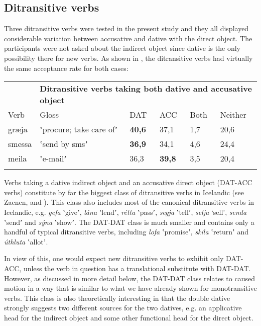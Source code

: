 \documentclass[output=paper,modfonts,nonflat]{langsci/langscibook}
\begin{document}
\subsection{Ditransitive verbs} %

Three ditransitive verbs were tested in the present study and they all displayed considerable variation between accusative and dative with the direct object. The participants were not asked about the indirect object since dative is the only possibility there for new verbs. As shown in , the ditransitive verbs had virtually the same acceptance rate for both cases:

\tablefirsthead{}

\tabletail{}
\tablelasttail{}
\begin{tabularx}{\textwidth}{XXXXXX}
\lsptoprule

\multicolumn{1}{X}{{\bfseries \tabref{tab:key:5}:}} & \multicolumn{5}{X}{{\bfseries Ditransitive verbs taking both dative and accusative object}}\\
Verb & Gloss & DAT & ACC & Both & Neither\\
græja & ʽprocure; take care ofʼ & \textbf{40,6} & 37,1 & 1,7 & 20,6\\
smessa & ʽsend by smsʼ & \textbf{36,9} & 34,1 & 4,6 & 24,4\\
meila & ʽe-mailʼ & 36,3 & \textbf{39,8} & 3,5 & 20,4\\
\lspbottomrule
\end{tabularx}
Verbs taking a dative indirect object and an accusative direct object (DAT-ACC verbs) constitute by far the biggest class of ditransitive verbs in Icelandic (see Zaenen, \citealt{MalingThráinsson1985} and \citealt{Jónsson2000}). This class also includes most of the canonical ditransitive verbs in Icelandic, e.g. \textit{gefa} ʽgiveʼ, \textit{lána} ʽlendʼ, \textit{rétta} ʽpassʼ, \textit{segja} ʽtellʼ, \textit{selja} ‘sell’, \textit{senda} ʽsendʼ and \textit{sýna} ʽshowʼ. The DAT-DAT class is much smaller and contains only a handful of typical ditransitive verbs, including \textit{lofa} ʽpromiseʼ, \textit{skila} ʽreturnʼ and \textit{úthluta} ʽallotʼ. 

In view of this, one would expect new ditransitive verbs to exhibit only DAT-ACC, unless the verb in question has a translational substitute with DAT-DAT. However, as discussed in more detail below, the DAT-DAT class relates to caused motion in a way that is similar to what we have already shown for monotransitive verbs. This class is also theoretically interesting in that the double dative strongly suggests two different sources for the two datives, e.g. an applicative head for the indirect object and some other functional head for the direct object. 
\end{document}

